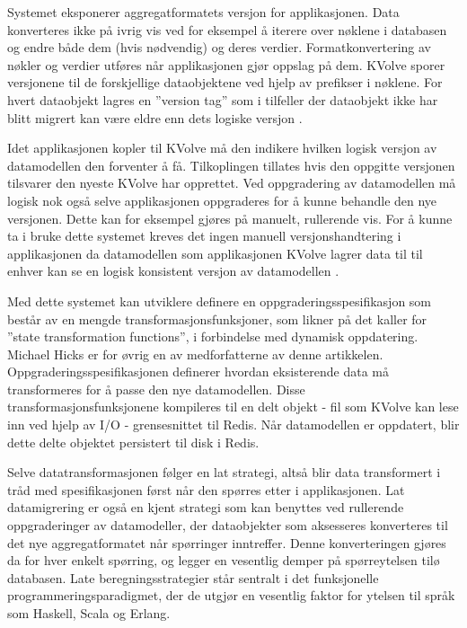 Systemet eksponerer aggregatformatets versjon for applikasjonen. Data konverteres ikke på ivrig vis ved for eksempel å iterere over nøklene i databasen og endre både dem (hvis nødvendig) og deres verdier. Formatkonvertering av nøkler og verdier utføres når applikasjonen gjør oppslag på dem. KVolve sporer versjonene til de forskjellige dataobjektene ved hjelp av prefikser i nøklene. For hvert dataobjekt lagres en ''version tag'' som i tilfeller der dataobjekt ikke har blitt migrert kan være eldre enn dets logiske versjon \citep{saur2016}.

Idet applikasjonen kopler til KVolve må den indikere hvilken logisk versjon av datamodellen den forventer å få. Tilkoplingen tillates hvis den oppgitte versjonen tilsvarer den nyeste KVolve har opprettet. Ved oppgradering av datamodellen må logisk nok også selve applikasjonen oppgraderes for å kunne behandle den nye versjonen. Dette kan for eksempel gjøres på manuelt, rullerende vis. For å kunne ta i bruke dette systemet kreves det ingen manuell versjonshandtering i applikasjonen da datamodellen som applikasjonen KVolve lagrer data til til enhver kan se en logisk konsistent versjon av datamodellen \citep{saur2016}.

Med dette systemet kan utviklere definere en oppgraderingsspesifikasjon som består av en mengde transformasjonsfunksjoner, som likner på det \cite{hicks2005dsu} kaller for ''state transformation functions'', i forbindelse med dynamisk oppdatering. Michael Hicks er for øvrig en av medforfatterne av denne artikkelen. Oppgraderingsspesifikasjonen definerer hvordan eksisterende data må transformeres for å passe den nye datamodellen. Disse transformasjonsfunksjonene kompileres til en delt objekt - fil som KVolve kan lese inn ved hjelp av I/O - grensesnittet til Redis. Når datamodellen er oppdatert, blir dette delte objektet persistert til disk i Redis.

Selve datatransformasjonen følger en lat strategi, altså blir data transformert i tråd med spesifikasjonen først når den spørres etter i applikasjonen. Lat datamigrering er også en kjent strategi som kan benyttes ved rullerende oppgraderinger av datamodeller, der dataobjekter som aksesseres konverteres til det nye aggregatformatet når spørringer inntreffer. Denne konverteringen gjøres da for hver enkelt spørring, og legger en vesentlig demper på spørreytelsen tilø databasen. Late beregningsstrategier står sentralt i det funksjonelle programmeringsparadigmet, der de utgjør en vesentlig faktor for ytelsen til språk som Haskell, Scala og Erlang.

